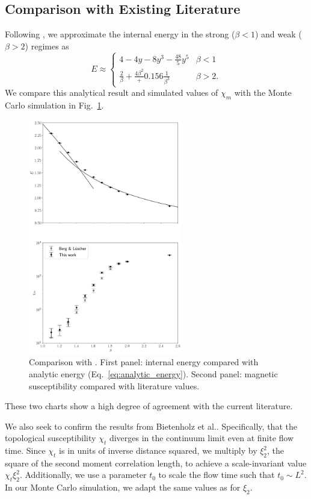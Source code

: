 \subsection{Comparison with Existing Literature}
Following \cite{berg1981}, we approximate the internal energy in the strong ($\beta<1$) and weak ($\beta>2$) regimes as 
\begin{equation}
    \label{eq:analytic_energy}
E \approx \begin{cases} 
    4-4y-8y^3-\frac{48}{5}y^5& \beta<1 \\
    \frac{2}{\beta} + \frac{4\beta^2} + 0.156\frac{1}{\beta^3}& \beta>2. 
\end{cases}
\end{equation}
We compare this analytical result and simulated values of $\chi_m$ with the Monte Carlo simulation in Fig.~\ref{fig:bergluscher}.
\begin{figure}[h]
    \centering
      \includegraphics[width=0.6\textwidth]{imgs/internal_energy.png}
      \caption{\label{fig:bergluscher}Comparison with \cite{berg1981}. First panel: internal energy compared with analytic  energy (Eq.~\ref{eq:analytic_energy}). Second panel: magnetic susceptibility compared with literature values.}
\end{figure}
These two charts show a high degree of agreement with the current literature.

We also seek to confirm the results from Bietenholz et al.\cite{bietenholz2018}. Specifically, that the topological susceptibility $\chi_t$ diverges in the continuum limit even at finite flow time. Since $\chi_t$ is in units of inverse distance squared, we multiply by $\xi_2^2$, the square of the second moment correlation length, to achieve a scale-invariant value $\chi_t\xi_2^2$. Additionally, we use a parameter $t_0$ to scale the flow time such that $t_0\sim L^2$. In our Monte Carlo simulation, we adapt the same values as \cite{bietenholz2018} for $\xi_2$.

